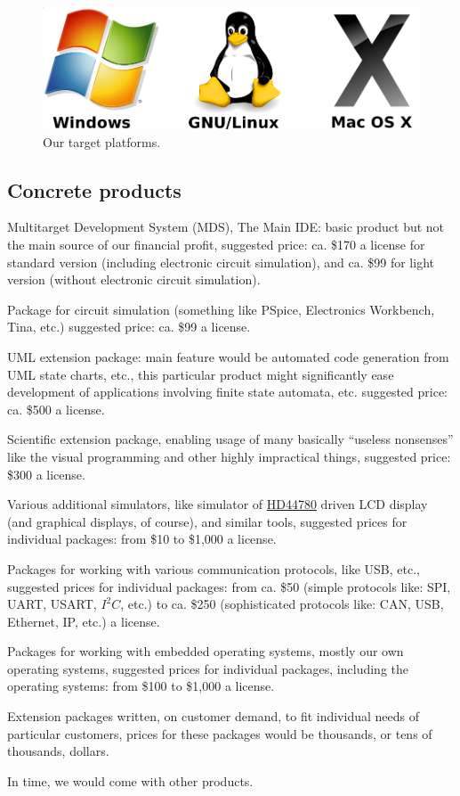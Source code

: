 \documentclass[a4paper,twoside,15pt]{book}
\begin{document}
        \begin{figure}[h!]
            \centering{}
            \includegraphics[width=.5\textwidth]{images/os.png}
            \caption{Our target platforms.}
        \end{figure}

        \subsection{Concrete products}
            \begin{dinglist}{73}
                \item Multitarget Development System (MDS), The Main IDE: basic product but not the main source of our financial profit, suggested price: ca. \$170 a license for standard version (including electronic circuit simulation), and ca. \$99 for light version (without electronic circuit simulation).
                \item Package for circuit simulation (something like PSpice, Electronics Workbench, Tina, etc.) suggested price: ca. \$99 a license.
                \item UML extension package: main feature would be automated code generation from UML state charts, etc., this particular product might significantly ease development of applications involving finite state automata, etc. suggested price: ca. \$500 a license.
                \item Scientific extension package, enabling usage of many basically ``useless nonsenses'' like the visual programming and other highly impractical things, suggested price: \$300 a license.
                \item Various additional simulators, like simulator of \href{http://en.wikipedia.org/wiki/Hitachi_HD44780_LCD_controller}{HD44780} driven LCD display (and graphical displays, of course), and similar tools, suggested prices for individual packages: from \$10 to \$1,000 a license.
                \item Packages for working with various communication protocols, like USB, etc., suggested prices for individual packages: from ca. \$50 (simple protocols like: SPI, UART, USART, $I^2C$, etc.) to ca. \$250 (sophisticated protocols like: CAN, USB, Ethernet, IP, etc.) a license.
                \item Packages for working with embedded operating systems, mostly our own operating systems, suggested prices for individual packages, including the operating systems: from \$100 to \$1,000 a license.
                \item Extension packages written, on customer demand, to fit individual needs of particular customers, prices for these packages would be thousands, or tens of thousands, dollars.
                \item In time, we would come with other products.
            \end{dinglist}
\end{document}

